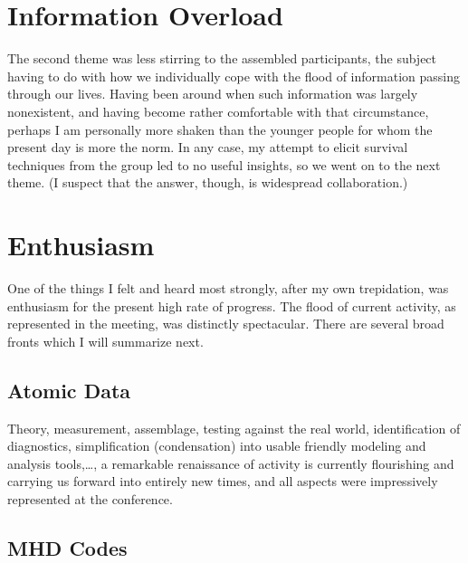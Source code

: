 \documentclass[proceedings]{rmaa}
\begin{document}
\section{Information Overload}
\vspace*{-0.5ex}

The second theme was less stirring to the assembled participants, the 
subject having to do with how we individually cope with the flood of 
information passing through our lives.  Having been around when such 
information was largely nonexistent, and having become rather comfortable 
with that circumstance, perhaps I am personally more shaken than the 
younger people for whom the present day is more the norm.  In any case, 
my attempt to elicit survival techniques from the group led to no useful  
insights, so we went on to the next theme.  (I suspect that the answer, 
though, is widespread collaboration.)
\vspace*{-0.5ex}

\section{Enthusiasm}
\vspace*{-0.5ex}

One of the things I felt and heard most strongly, after my own 
trepidation, was enthusiasm for the present high rate of progress.  The 
flood of current activity, as represented in the meeting, was distinctly  
spectacular.  There are several broad fronts which I will summarize next.
\vspace*{-0.5ex}

\subsection{Atomic Data}
\vspace*{-0.5ex}

        Theory, measurement, assemblage, testing against the real world, 
identification of diagnostics, simplification (condensation) into usable  
friendly modeling and analysis tools,\dots, a remarkable renaissance of 
activity is currently flourishing and carrying us forward into entirely 
new times, and all aspects were impressively represented at the conference.
\vspace*{-0.5ex}

\subsection{MHD Codes}
\vspace*{-0.5ex}
\end{document}
